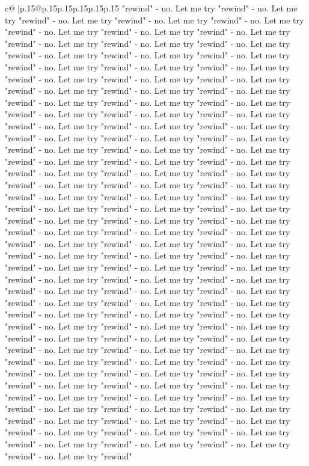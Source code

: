 \documentclass{article}
\begin{document}
{\begin{supertabular}{c@{$\;$}|p{.15\linewidth}@{}p{.15\linewidth}p{.15\linewidth}p{.15\linewidth}p{.15\linewidth}p{.15\linewidth}}
{{{"rewind" {-} no. Let me try "rewind" {-} no. Let me try "rewind" {-} no. Let me try "rewind" {-} no. Let me try "rewind" {-} no. Let me try "rewind" {-} no. Let me try "rewind" {-} no. Let me try "rewind" {-} no. Let me try "rewind" {-} no. Let me try "rewind" {-} no. Let me try "rewind" {-} no. Let me try "rewind" {-} no. Let me try "rewind" {-} no. Let me try "rewind" {-} no. Let me try "rewind" {-} no. Let me try "rewind" {-} no. Let me try "rewind" {-} no. Let me try "rewind" {-} no. Let me try "rewind" {-} no. Let me try "rewind" {-} no. Let me try "rewind" {-} no. Let me try "rewind" {-} no. Let me try "rewind" {-} no. Let me try "rewind" {-} no. Let me try "rewind" {-} no. Let me try "rewind" {-} no. Let me try "rewind" {-} no. Let me try "rewind" {-} no. Let me try "rewind" {-} no. Let me try "rewind" {-} no. Let me try "rewind" {-} no. Let me try "rewind" {-} no. Let me try "rewind" {-} no. Let me try "rewind" {-} no. Let me try "rewind" {-} no. Let me try "rewind" {-} no. Let me try "rewind" {-} no. Let me try "rewind" {-} no. Let me try "rewind" {-} no. Let me try "rewind" {-} no. Let me try "rewind" {-} no. Let me try "rewind" {-} no. Let me try "rewind" {-} no. Let me try "rewind" {-} no. Let me try "rewind" {-} no. Let me try "rewind" {-} no. Let me try "rewind" {-} no. Let me try "rewind" {-} no. Let me try "rewind" {-} no. Let me try "rewind" {-} no. Let me try "rewind" {-} no. Let me try "rewind" {-} no. Let me try "rewind" {-} no. Let me try "rewind" {-} no. Let me try "rewind" {-} no. Let me try "rewind" {-} no. Let me try "rewind" {-} no. Let me try "rewind" {-} no. Let me try "rewind" {-} no. Let me try "rewind" {-} no. Let me try "rewind" {-} no. Let me try "rewind" {-} no. Let me try "rewind" {-} no. Let me try "rewind" {-} no. Let me try "rewind" {-} no. Let me try "rewind" {-} no. Let me try "rewind" {-} no. Let me try "rewind" {-} no. Let me try "rewind" {-} no. Let me try "rewind" {-} no. Let me try "rewind" {-} no. Let me try "rewind" {-} no. Let me try "rewind" {-} no. Let me try "rewind" {-} no. Let me try "rewind" {-} no. Let me try "rewind" {-} no. Let me try "rewind" {-} no. Let me try "rewind" {-} no. Let me try "rewind" {-} no. Let me try "rewind" {-} no. Let me try "rewind" {-} no. Let me try "rewind" {-} no. Let me try "rewind" {-} no. Let me try "rewind" {-} no. Let me try "rewind" {-} no. Let me try "rewind" {-} no. Let me try "rewind" {-} no. Let me try "rewind" {-} no. Let me try "rewind" {-} no. Let me try "rewind" {-} no. Let me try "rewind" {-} no. Let me try "rewind" {-} no. Let me try "rewind" {-} no. Let me try "rewind" {-} no. Let me try "rewind" {-} no. Let me try "rewind" {-} no. Let me try "rewind" {-} no. Let me try "rewind" {-} no. Let me try "rewind" {-} no. Let me try "rewind" {-} no. Let me try "rewind" {-} no. Let me try "rewind" {-} no. Let me try "rewind" {-} no. Let me try "rewind" {-} no. Let me try "rewind" {-} no. Let me try "rewind" {-} no. Let me try "rewind" {-} no. Let me try "rewind" {-} no. Let me try "rewind" {-} no. Let me try "rewind" {-} no. Let me try "rewind" {-} no. Let me try "rewind" {-} no. Let me try "rewind" {-} no. Let me try "rewind" {-} no. Let me try "rewind" }}}
\end{supertabular}}
\end{document}
